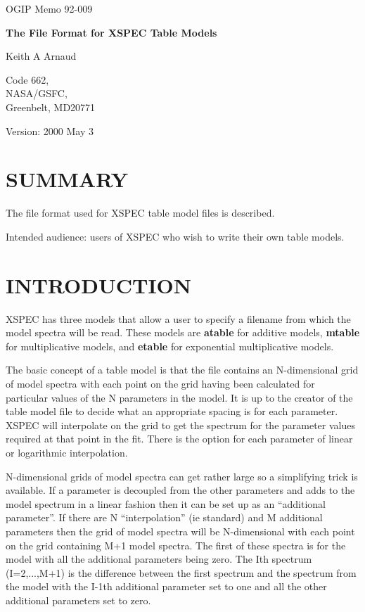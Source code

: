 \documentclass[11pt]{article}
\begin{document}
OGIP Memo 92-009
\vspace{1cm}
\begin{center}
\Large

\Large
{\bf The File Format for XSPEC Table Models}

\normalsize

Keith A Arnaud
\small

Code 662, \\
NASA/GSFC, \\
Greenbelt, MD20771

\normalsize
Version: 2000 May 3

\vspace{2cm}
\section*{SUMMARY}

\begin{minipage}[t]{13cm}
The file format used for XSPEC table model files is described.

Intended audience: users of XSPEC who wish to write their own table models.
\end{minipage}
\end{center}

\newpage
\section{INTRODUCTION}

XSPEC has three models that allow a user to specify a filename from
which the model spectra will be read. These models are {\bf atable}
for additive models, {\bf mtable} for multiplicative models, and
{\bf etable} for exponential multiplicative models.

The basic concept of a table model is that the file contains an
N-dimensional grid of model spectra with each point on the grid
having been calculated for particular values of the N parameters
in the model. It is up to the creator of the table model file to
decide what an appropriate spacing is for each parameter. XSPEC
will interpolate on the grid to get the spectrum for the parameter
values required at that point in the fit. There is the option for
each parameter of linear or logarithmic interpolation.

N-dimensional grids of model spectra can get rather large so a
simplifying trick is available. If a parameter is decoupled from
the other parameters and adds to the model spectrum in a linear
fashion then it can be set up as an ``additional parameter''.
If there are N ``interpolation'' (ie standard) and M additional
parameters then the grid of model spectra will be N-dimensional
with each point on the grid containing M+1 model spectra. The
first of these spectra is for the model with all the additional
parameters being zero. The Ith spectrum (I=2,...,M+1) is the difference
between the first spectrum and the spectrum from the model with
the I-1th additional parameter set to one and all the other additional
parameters set to zero.
\end{document}
